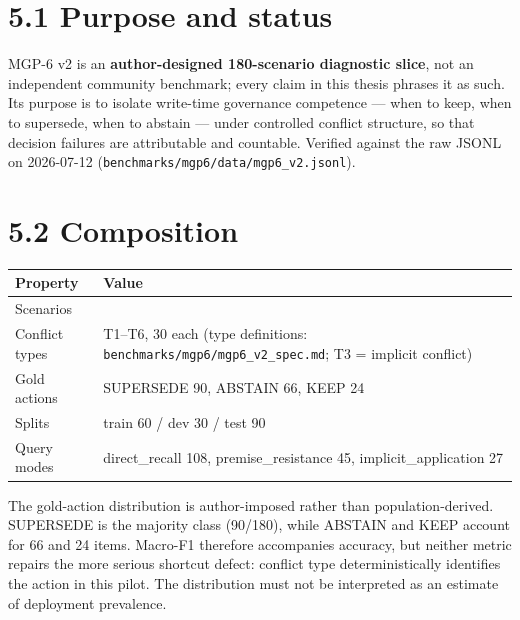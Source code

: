 \section{5.1 Purpose and status}\label{purpose-and-status}

MGP-6 v2 is an \textbf{author-designed 180-scenario diagnostic slice},
not an independent community benchmark; every claim in this thesis
phrases it as such. Its purpose is to isolate write-time governance
competence --- when to keep, when to supersede, when to abstain ---
under controlled conflict structure, so that decision failures are
attributable and countable. Verified against the raw JSONL on 2026-07-12
(\texttt{benchmarks/mgp6/data/mgp6\_v2.jsonl}).

\section{5.2 Composition}\label{composition}

{\def\LTcaptype{none} %
\begin{longtable}[]{@{}
  >{\raggedright\arraybackslash}p{}
  >{\raggedright\arraybackslash}p{}@{}}
\toprule\noalign{}
\begin{minipage}[b]{\linewidth}\raggedright
Property
\end{minipage} & \begin{minipage}[b]{\linewidth}\raggedright
Value
\end{minipage} \\
\midrule\noalign{}
\endhead
\bottomrule\noalign{}
\endlastfoot
Scenarios & 180 \\
Conflict types & T1--T6, 30 each (type definitions:
\texttt{benchmarks/mgp6/mgp6\_v2\_spec.md}; T3 = implicit conflict) \\
Gold actions & SUPERSEDE 90, ABSTAIN 66, KEEP 24 \\
Splits & train 60 / dev 30 / test 90 \\
Query modes & direct\_recall 108, premise\_resistance 45,
implicit\_application 27 \\
\end{longtable}
}

The gold-action distribution is author-imposed rather than
population-derived. SUPERSEDE is the majority class (90/180), while
ABSTAIN and KEEP account for 66 and 24 items. Macro-F1 therefore
accompanies accuracy, but neither metric repairs the more serious
shortcut defect: conflict type deterministically identifies the action
in this pilot. The distribution must not be interpreted as an estimate
of deployment prevalence.

